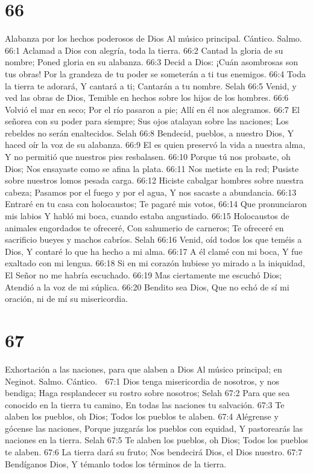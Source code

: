 \chapter{66}

Alabanza por los hechos poderosos de Dios 
Al músico principal. Cántico. Salmo. 

66:1 Aclamad a Dios con alegría, toda la tierra. 
66:2 Cantad la gloria de su nombre; 
Poned gloria en su alabanza. 
66:3 Decid a Dios: ¡Cuán asombrosas son tus obras! 
Por la grandeza de tu poder se someterán a ti tus enemigos. 
66:4 Toda la tierra te adorará, 
Y cantará a ti; 
Cantarán a tu nombre. Selah 
66:5 Venid, y ved las obras de Dios, 
Temible en hechos sobre los hijos de los hombres. 
66:6 Volvió el mar en seco; 
Por el río pasaron a pie; 
Allí en él nos alegramos. 
66:7 El señorea con su poder para siempre; 
Sus ojos atalayan sobre las naciones; 
Los rebeldes no serán enaltecidos. Selah 
66:8 Bendecid, pueblos, a nuestro Dios, 
Y haced oír la voz de su alabanza. 
66:9 El es quien preservó la vida a nuestra alma, 
Y no permitió que nuestros pies resbalasen. 
66:10 Porque tú nos probaste, oh Dios; 
Nos ensayaste como se afina la plata. 
66:11 Nos metiste en la red; 
Pusiste sobre nuestros lomos pesada carga. 
66:12 Hiciste cabalgar hombres sobre nuestra cabeza; 
Pasamos por el fuego y por el agua, 
Y nos sacaste a abundancia. 
66:13 Entraré en tu casa con holocaustos; 
Te pagaré mis votos, 
66:14 Que pronunciaron mis labios 
Y habló mi boca, cuando estaba angustiado. 
66:15 Holocaustos de animales engordados te ofreceré, 
Con sahumerio de carneros; 
Te ofreceré en sacrificio bueyes y machos cabríos. Selah 
66:16 Venid, oíd todos los que teméis a Dios, 
Y contaré lo que ha hecho a mi alma. 
66:17 A él clamé con mi boca, 
Y fue exaltado con mi lengua. 
66:18 Si en mi corazón hubiese yo mirado a la iniquidad, 
El Señor no me habría escuchado. 
66:19 Mas ciertamente me escuchó Dios; 
Atendió a la voz de mi súplica. 
66:20 Bendito sea Dios, 
Que no echó de sí mi oración, ni de mí su misericordia. 

\chapter{67}

Exhortación a las naciones, para que alaben a Dios 
Al músico principal; en Neginot. Salmo. Cántico. 

67:1 Dios tenga misericordia de nosotros, y nos bendiga; 
Haga resplandecer su rostro sobre nosotros; Selah 
67:2 Para que sea conocido en la tierra tu camino, 
En todas las naciones tu salvación. 
67:3 Te alaben los pueblos, oh Dios; 
Todos los pueblos te alaben. 
67:4 Alégrense y gócense las naciones, 
Porque juzgarás los pueblos con equidad, 
Y pastorearás las naciones en la tierra. Selah 
67:5 Te alaben los pueblos, oh Dios; 
Todos los pueblos te alaben. 
67:6 La tierra dará su fruto; 
Nos bendecirá Dios, el Dios nuestro. 
67:7 Bendíganos Dios, 
Y témanlo todos los términos de la tierra. 

